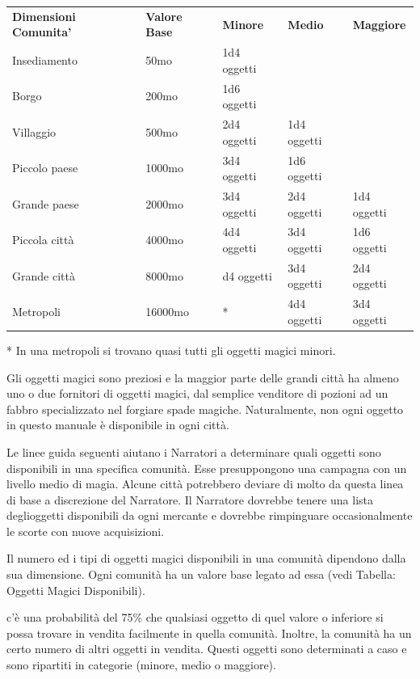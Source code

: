\documentclass[a4paper,11pt,twoside,openany]{book}
\begin{document}
\begin{tabular}{lllll}
	\toprule
	\textbf{Dimensioni Comunita'} & \textbf{Valore Base} & \textbf{Minore} & \textbf{Medio} & \textbf{Maggiore}\tabularnewline
	Insediamento                  & 50mo                 & 1d4 oggetti     &                & \tabularnewline
	Borgo                         & 200mo                & 1d6 oggetti     &                & \tabularnewline
	Villaggio                     & 500mo                & 2d4 oggetti     & 1d4 oggetti    & \tabularnewline
	Piccolo paese                 & 1000mo               & 3d4 oggetti     & 1d6 oggetti    & \tabularnewline
	Grande paese                  & 2000mo               & 3d4 oggetti     & 2d4 oggetti    & 1d4 oggetti\tabularnewline
	Piccola città                 & 4000mo               & 4d4 oggetti     & 3d4 oggetti    & 1d6 oggetti\tabularnewline
	Grande città                  & 8000mo               & d4 oggetti      & 3d4 oggetti    & 2d4 oggetti\tabularnewline
	Metropoli                     & 16000mo              & {*}             & 4d4 oggetti    & 3d4 oggetti\tabularnewline
\end{tabular}

{*} In una metropoli si trovano quasi tutti gli oggetti magici minori.

\bigskip

Gli oggetti magici sono preziosi e la maggior parte delle grandi città ha almeno uno o due fornitori di oggetti magici, dal semplice venditore di pozioni ad un fabbro specializzato nel forgiare spade magiche. Naturalmente, non ogni oggetto in questo manuale è disponibile in ogni città.

Le linee guida seguenti aiutano i Narratori a determinare quali oggetti sono disponibili in una specifica comunità. Esse presuppongono una campagna con un livello medio di magia. Alcune città potrebbero deviare di molto da questa linea di base a discrezione del Narratore. Il Narratore dovrebbe tenere una lista deglioggetti disponibili da ogni mercante e dovrebbe rimpinguare occasionalmente le scorte con nuove acquisizioni.

Il numero ed i tipi di oggetti magici disponibili in una comunità dipendono dalla sua dimensione. Ogni comunità ha un valore base legato ad essa (vedi Tabella: Oggetti Magici Disponibili).

c'è una probabilità del 75\% che qualsiasi oggetto di quel valore o inferiore si possa trovare in vendita facilmente in quella comunità. Inoltre, la comunità ha un certo numero di altri oggetti in vendita. Questi oggetti sono determinati a caso e sono ripartiti in categorie (minore, medio o maggiore).
\end{document}
